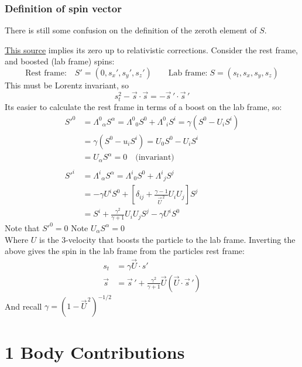 \documentclass[11pt]{article}
\newcommand{\sq}{^{\,2}}
\begin{document}
\subsubsection{Definition of spin vector}
There is still some confusion on the definition of the zeroth element of $S$.

\href{https://en.wikipedia.org/wiki/Relativistic_angular_momentum#Spin_in_special_relativity}{This source}
implies its zero up to relativistic corrections. Consider the rest frame, and boosted (lab frame) spins:
\begin{equation}
    \text{Rest frame:}\quad S'= (0, s_x',s_y',s_z')
    \qquad\text{Lab frame:}\;
    S=(s_t, s_x,s_y,s_z)
\end{equation}
This must be Lorentz invariant, so 
\begin{equation}
    s_t^2 - \vec{s}\cdot \vec{s} = - \vec{s}\,' \cdot \vec{s}\,'
\end{equation}
Its easier to calculate the rest frame in terms of a boost on the lab frame, so:
\begin{align}
{S'}^{0}&={\Lambda ^{0}}_{\alpha }S^{\alpha }={\Lambda ^{0}}_{0}S^{0}+{\Lambda ^{0}}_{i}S^{i}=\gamma \left(S^{0}-U_{i}S^{i}\right)\\
        &=\gamma \left(S^{0}-u_i S^{i}\right)=U_{0}S^{0}-U_{i}S^{i}\\
        &=U_\alpha S^\alpha=0\quad\text{(invariant)}\\
        &\nonumber\\
{S'}^{i}&={\Lambda ^{i}}_{\alpha }S^{\alpha }={\Lambda ^{i}}_{0}S^{0}+{\Lambda ^{i}}_{j}S^{j}\\
        &=-\gamma U^{i}S^{0}+\left[\delta _{ij}+{\frac {\gamma -1}{\vec{U}^{\,2}}}U_{i}U_{j}\right]S^{j}\\
        & =S^{i}+{\frac {\gamma ^{2}}{\gamma +1}}U_{i}U_{j}S^{j}-\gamma U^{i}S^{0}
\end{align}
Note that $S'^0=0$ 
Note $U_\alpha S^\alpha=0$\\
Where $U$ is the 3-velocity that boosts the particle to the lab frame. Inverting the above gives the spin in the lab
frame from the particles rest frame:
\begin{align}
    s_t&= \gamma \vec{U} \cdot s'\\
    \vec{s}&= \vec{s}{\,'}+ \frac{\gamma^2}{\gamma+1}  \vec{U} \left( \vec{U} \cdot \vec{s}{\,'} \right)
\end{align}
And recall $\gamma= \left( 1-\vec{U}\sq \right)^{-1/2}$
\section{1 Body Contributions}
\end{document}
